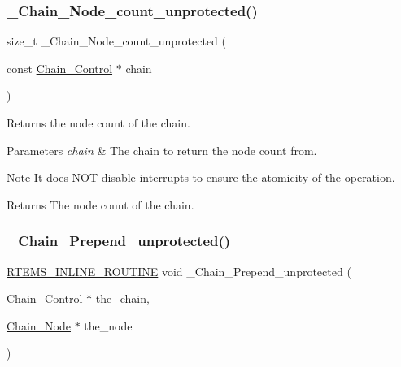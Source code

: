 \subsubsection{\texorpdfstring{\_Chain\_Node\_count\_unprotected()}{\_Chain\_Node\_count\_unprotected()}}
{\footnotesize\ttfamily size\+\_\+t \+\_\+\+Chain\+\_\+\+Node\+\_\+count\+\_\+unprotected (\begin{DoxyParamCaption}\item[{const \mbox{\hyperlink{unionChain__Control}{Chain\+\_\+\+Control}} $\ast$}]{chain }\end{DoxyParamCaption})}



Returns the node count of the chain. 


\begin{DoxyParams}{Parameters}
{\em chain} & The chain to return the node count from.\\
\hline
\end{DoxyParams}
\begin{DoxyNote}{Note}
It does N\+OT disable interrupts to ensure the atomicity of the operation.
\end{DoxyNote}
\begin{DoxyReturn}{Returns}
The node count of the chain. 
\end{DoxyReturn}
\mbox{\label{group__RTEMSScoreChain_ga8d8497bea6684f4c685056c75f35522c}} 
\subsubsection{\texorpdfstring{\_Chain\_Prepend\_unprotected()}{\_Chain\_Prepend\_unprotected()}}
{\footnotesize\ttfamily \mbox{\hyperlink{group__RTEMSScoreBaseDefs_gac216239df231d5dbd15e3520b0b9313f}{R\+T\+E\+M\+S\+\_\+\+I\+N\+L\+I\+N\+E\+\_\+\+R\+O\+U\+T\+I\+NE}} void \+\_\+\+Chain\+\_\+\+Prepend\+\_\+unprotected (\begin{DoxyParamCaption}\item[{\mbox{\hyperlink{unionChain__Control}{Chain\+\_\+\+Control}} $\ast$}]{the\+\_\+chain,  }\item[{\mbox{\hyperlink{group__RTEMSScoreChain_ga0dd4bfcca1ac7f90de2842e447846d3d}{Chain\+\_\+\+Node}} $\ast$}]{the\+\_\+node }\end{DoxyParamCaption})}



